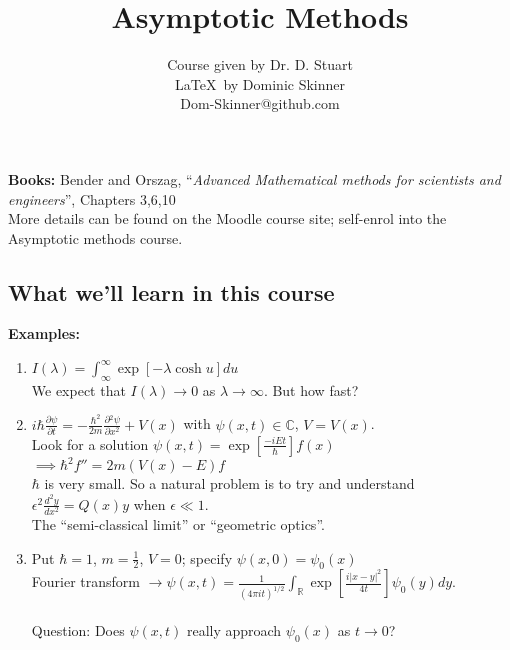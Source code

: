 \documentclass{article}
\newcommand{\pder}[2] {\frac{\partial {#1}}{\partial {#2} }}%
\begin{document}
\title{Asymptotic Methods}
\author{Course given by Dr. D. Stuart \\
\LaTeX\  by Dominic Skinner \\
Dom-Skinner@github.com}
\maketitle
\noindent \textbf{Books:} Bender and Orszag, ``\emph{Advanced Mathematical methods for 
scientists and engineers}'', Chapters 3,6,10 \\
More details can be found on the Moodle course site; self-enrol into the
Asymptotic methods course.
\\
\subsection*{What we'll learn in this course}
\textbf{Examples:} 
\begin{enumerate}[1.]
\item $\displaystyle I(\lambda) = \int_{\infty}^{\infty} \exp[-\lambda \cosh u] du $
      \\ We expect that $I(\lambda) \to 0$ as $\lambda \to \infty$. But how fast?
\\
\item $\displaystyle i \hbar \pder{\psi}{t} = -\frac{\hbar^2}{2m}
      \pder{^2 \psi}{x^2} + V(x)$ with $\psi(x,t) \in \mathbb{C}$,
      $V = V(x)$. \\
      Look for a solution $\displaystyle \psi(x,t) = \exp \left[\frac{-iEt}{\hbar} 
      \right] f(x)$
      $\implies \hbar^2 f'' = 2m(V(x) -E)f$ 
      \\
      $\hbar$ is very small. So a natural problem is to try and understand
      $\displaystyle \epsilon^2 \frac{d^2y}{dx^2} = Q(x)y$ when $\epsilon \ll 1$.
      \\ The ``semi-classical limit'' or ``geometric optics''.
\\
\item Put $\hbar = 1$, $m=\frac{1}{2}$, $V=0$; specify $\psi(x,0) = \psi_0(x)$
      \\[2pt]
      Fourier transform $\displaystyle \to \psi(x,t) = \frac{1}{(4\pi i t)^{1/2}} 
      \int_{\mathbb{R}} \exp\left[ \frac{i|x-y|^2}{4t} \right] \psi_0(y) dy$.
      \\
      \\
      Question: Does $\psi(x,t)$ really approach $\psi_0(x)$ as $t\to0$?
\end{enumerate}
%
\end{document}

